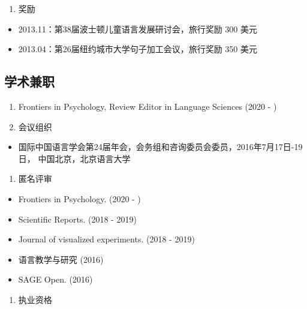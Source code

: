 \documentclass[
  12pt,
]{article}
\providecommand{\tightlist}{%
  \setlength{\itemsep}{0pt}\setlength{\parskip}{0pt}}
\begin{document}
\begin{enumerate}
\def\labelenumi{\arabic{enumi}.}
\setcounter{enumi}{2}
\tightlist
\item
  奖励
\end{enumerate}

\begin{itemize}
\item
  2013.11：第38届波士顿儿童语言发展研讨会，旅行奖励 300 美元
\item
  2013.04：第26届纽约城市大学句子加工会议，旅行奖励 350 美元
\end{itemize}

\hypertarget{ux5b66ux672fux517cux804c}{%
\subsection{学术兼职}\label{ux5b66ux672fux517cux804c}}

\begin{enumerate}
\def\labelenumi{\arabic{enumi}.}
\item
  Frontiers in Psychology, Review Editor in Language Sciences (2020 - )
\item
  会议组织
\end{enumerate}

\begin{itemize}
\tightlist
\item
  国际中国语言学会第24届年会，会务组和咨询委员会委员，2016年7月17日-19日，
  中国北京，北京语言大学
\end{itemize}

\begin{enumerate}
\def\labelenumi{\arabic{enumi}.}
\setcounter{enumi}{1}
\tightlist
\item
  匿名评审
\end{enumerate}

\begin{itemize}
\item
  Frontiers in Psychology. (2020 - )
\item
  Scientific Reports. (2018 - 2019)
\item
  Journal of visualized experiments. (2018 - 2019)
\item
  语言教学与研究 (2016)
\item
  SAGE Open. (2016)
\end{itemize}

\begin{enumerate}
\def\labelenumi{\arabic{enumi}.}
\setcounter{enumi}{2}
\tightlist
\item
  执业资格
\end{enumerate}
\end{document}
